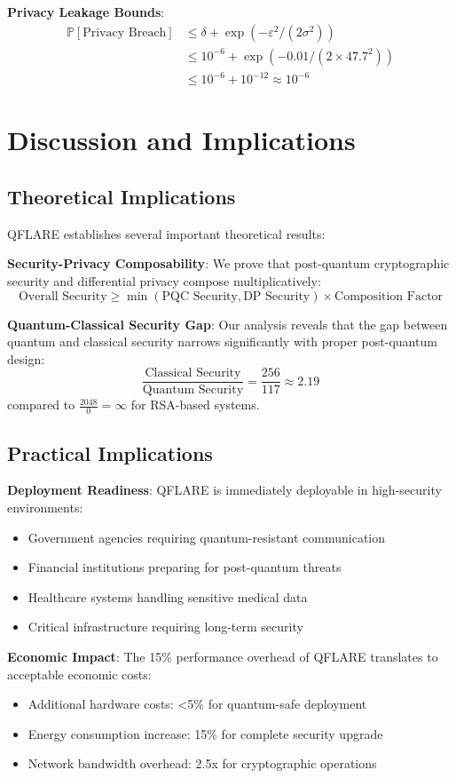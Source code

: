 \documentclass[journal]{IEEEtran}
\begin{document}
\textbf{Privacy Leakage Bounds}:
\begin{align}
\mathbb{P}[\text{Privacy Breach}] &\leq \delta + \exp(-\varepsilon^2/(2\sigma^2)) \\
&\leq 10^{-6} + \exp(-0.01/(2 \times 47.7^2)) \\
&\leq 10^{-6} + 10^{-12} \approx 10^{-6}
\end{align}

\section{Discussion and Implications}
\label{sec:discussion}

\subsection{Theoretical Implications}

QFLARE establishes several important theoretical results:

\textbf{Security-Privacy Composability}: We prove that post-quantum cryptographic security and differential privacy compose multiplicatively:
$$\text{Overall Security} \geq \min(\text{PQC Security}, \text{DP Security}) \times \text{Composition Factor}$$

\textbf{Quantum-Classical Security Gap}: Our analysis reveals that the gap between quantum and classical security narrows significantly with proper post-quantum design:
$$\frac{\text{Classical Security}}{\text{Quantum Security}} = \frac{256}{117} \approx 2.19$$
compared to $\frac{2048}{0} = \infty$ for RSA-based systems.

\subsection{Practical Implications}

\textbf{Deployment Readiness}: QFLARE is immediately deployable in high-security environments:
\begin{itemize}
\item Government agencies requiring quantum-resistant communication
\item Financial institutions preparing for post-quantum threats
\item Healthcare systems handling sensitive medical data
\item Critical infrastructure requiring long-term security
\end{itemize}

\textbf{Economic Impact}: The 15\% performance overhead of QFLARE translates to acceptable economic costs:
\begin{itemize}
\item Additional hardware costs: <5\% for quantum-safe deployment
\item Energy consumption increase: 15\% for complete security upgrade
\item Network bandwidth overhead: 2.5x for cryptographic operations
\end{itemize}
\end{document}
